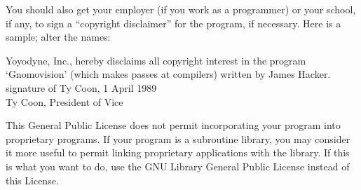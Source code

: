 \begin{lrbox}{\gpl}
\begin{minipage}{3\textwidth}
You should also get your employer (if you work as a programmer) or your
school, if any, to sign a ``copyright disclaimer'' for the program, if
necessary.  Here is a sample; alter the names:

\beginnarrower
  Yoyodyne, Inc., hereby disclaims all copyright interest in the program \\
  `Gnomovision' (which makes passes at compilers) written by James Hacker. \\

  signature of Ty Coon, 1 April 1989 \\
  Ty Coon, President of Vice
\endnarrower


This General Public License does not permit incorporating your program
into proprietary programs.  If your program is a subroutine library, you
may consider it more useful to permit linking proprietary applications
with the library.  If this is what you want to do, use the GNU Library
General Public License instead of this License.

\endtriplecolumns
\end{minipage}
\end{lrbox}

\begincentered
  \scalebox{0.33}{\usebox{\gpl}}
\endcentered

\endsection

\endinput

